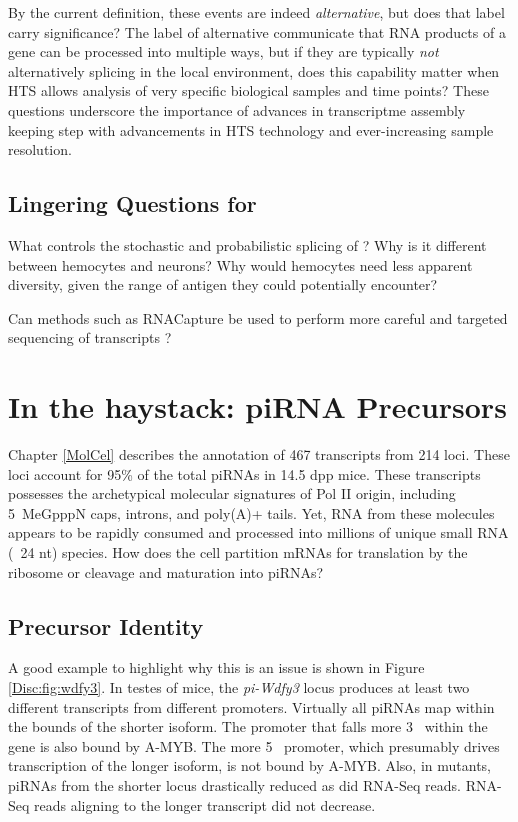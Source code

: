     By the current definition, these events are indeed \textit{alternative}, but does that label carry significance? The label of alternative communicate that RNA products of a gene can be processed into multiple ways, but if they are typically \textit{not} alternatively splicing in the local environment, does this capability matter when HTS allows analysis of very specific biological samples and time points? These questions underscore the importance of advances in transcriptme assembly keeping step with advancements in HTS technology and ever-increasing sample resolution.

  \subsection{Lingering Questions for \dscam{}}
    \label{Disc:sec:Dscam}

    What controls the stochastic and probabilistic splicing of \dscam{}? Why is it different between hemocytes and neurons? Why would hemocytes need less apparent diversity, given the range of antigen they could potentially encounter?

    Can methods such as RNACapture be used to perform more careful and targeted sequencing of \dscam{} transcripts \citep{Mercer2014}?

\section{In the haystack: piRNA Precursors}
  \label{Disc:sec:piRNA precursors}

  Chapter \ref{MolCel} describes the annotation of 467 transcripts from 214 loci. These loci account for 95\% of the total piRNAs in 14.5 dpp mice. These transcripts possesses the archetypical molecular signatures of Pol II origin, including 5\textprime~MeGpppN caps, introns, and poly(A)+ tails. Yet, RNA from these molecules appears to be rapidly consumed and processed into millions of unique small RNA (~24 nt) species. How does the cell partition mRNAs for translation by the ribosome or cleavage and maturation into piRNAs?

  \subsection{Precursor Identity}
    \label{Disc:subsec:How are precursors generated}

    A good example to highlight why this is an issue is shown in Figure \ref{Disc:fig:wdfy3}. In testes of mice, the \textit{pi-Wdfy3} locus produces at least two different transcripts from different promoters. Virtually all piRNAs map within the bounds of the shorter isoform. The promoter that falls more 3\textprime~ within the gene is also bound by A-MYB. The more 5\textprime~ promoter, which presumably drives transcription of the longer isoform, is not bound by A-MYB. Also, in \amyb{} mutants, piRNAs from the shorter locus drastically reduced as did RNA-Seq reads. RNA-Seq reads aligning to the longer transcript did not decrease. 

